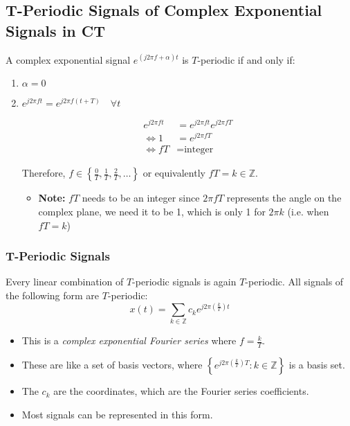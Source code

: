 \subsection{T-Periodic Signals of Complex Exponential Signals in CT}
\begin{definition}
    A complex exponential signal \( e^{(j2\pi f + \alpha)t} \) is \( T \)-periodic if and only if:

    \begin{enumerate}
        \item \( \alpha = 0 \)
        \item \( e^{j 2\pi f t} = e^{j 2\pi f (t + T)} \quad \forall t \)
        
        \begin{align*}
        e^{j 2\pi f t} &= e^{j 2\pi f t} e^{j 2\pi f T} \\
        \Longleftrightarrow 1 &= e^{j 2\pi f T} \\
        \Longleftrightarrow f T &= \text{integer}
        \end{align*}
        
        Therefore, \( f \in \left\{ \frac{0}{T}, \frac{1}{T}, \frac{2}{T}, \dots \right\} \) or equivalently \( f T = k \in \mathbb{Z} \).
        \begin{itemize}
            \item \textbf{Note:} $fT$ needs to be an integer since $2\pi f T$ represents the angle on the complex plane, we need it to be 1, which is only 1 for $2\pi k$ (i.e. when $fT=k$)
        \end{itemize}
    \end{enumerate}
\end{definition}

\subsubsection{T-Periodic Signals}
\begin{definition}
    Every linear combination of \( T \)-periodic signals is again \( T \)-periodic. All signals of the following form are \( T \)-periodic:
        \[
        x(t) = \sum_{k \in \mathbb{Z}} c_k e^{j 2\pi \left(\frac{k}{T}\right) t}
        \]
    \begin{itemize}
        \item This is a \textit{complex exponential Fourier series} where \( f = \frac{k}{T} \).
        \item These are like a set of basis vectors, where \( \left\{ e^{j 2\pi \left(\frac{k}{T}\right) T} : k \in \mathbb{Z} \right\} \) is a basis set.
        \item The \( c_k \) are the coordinates, which are the Fourier series coefficients.
        \item Most signals can be represented in this form.
    \end{itemize}
\end{definition}

